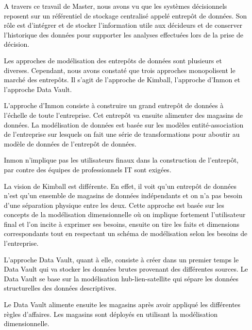 \documentclass[a4paper,12pt]{report}
\begin{document}
\textcolor{black}{A travers ce travail de Master, nous avons vu que les systèmes décisionnels reposent sur un référentiel de stockage centralisé appelé entrepôt de données. Son rôle est d'intégrer et de stocker l'information utile aux décideurs et de conserver l'historique des données pour supporter les analyses effectuées lors de la prise de décision. }


\textcolor{black}{Les approches de modélisation des entrepôts de données sont plusieurs et diverses. Cependant, nous avons constaté que trois approches monopolisent le marché des entrepôts. Il s’agit de l’approche de Kimball, l’approche d’Inmon et l’approche Data Vault. }


\textcolor{black}{L’approche d’Inmon consiste à construire un grand entrepôt de données à l’échelle de toute l’entreprise. Cet entrepôt va ensuite alimenter des magasins de données. La modélisation de données est basée sur les modèles entité-association de l’entreprise sur lesquels on fait une série de transformations pour aboutir au modèle de données de l’entrepôt de données. }



\textcolor{black}{  Inmon n’implique pas les utilisateurs finaux dans la construction de l’entrepôt, par contre des équipes de professionnels IT sont exigées. }

\textcolor{black}{
La vision de Kimball est différente. En effet, il voit qu’un entrepôt de données n’est qu’un ensemble de magasins de données indépendants et on n’a pas besoin d’une séparation physique entre les deux. Cette approche est basée sur les concepts de la modélisation dimensionnelle où on implique fortement l’utilisateur final et l’on incite à exprimer ses besoins, ensuite on tire les faits et dimensions correspondants tout en respectant un schéma de modélisation selon les besoins de l’entreprise.}




\textcolor{black}{L’approche Data Vault, quant à elle, consiste à créer dans un premier temps le Data Vault qui va stocker les données brutes provenant des différentes sources. Le Data Vault se base sur la modélisation hub-lien-satellite qui sépare les données structurelles des données descriptives. }



\textcolor{black}{Le Data Vault alimente ensuite les magasins après avoir appliqué les différentes règles d’affaires. Les magasins sont déployés en utilisant la modélisation dimensionnelle. }
\end{document}
